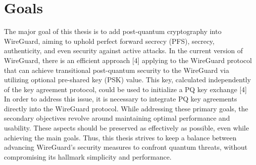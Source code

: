 

\section{Goals} 
The major goal of this thesis is to add post-quantum cryptography into WireGuard, aiming to uphold perfect forward secrecy (PFS), secrecy, authenticity, and even security against active attacks. In the current version of WireGuard, there is an efficient approach [4] applying to the WireGuard protocol that can achieve transitional post-quantum security to the WireGuard via utilizing optional pre-shared key (PSK) value. This key, calculated independently of the key agreement protocol, could be used to initialize a PQ key exchange [4]  In order to address this issue, it is necessary to integrate PQ key agreements directly into the WireGuard protocol. 
While addressing these primary goals, the secondary objectives revolve around maintaining optimal performance and usability. These aspects should be preserved as effectively as possible, even while achieving the main goals. Thus, this thesis strives to keep a balance between advancing WireGuard's security measures to confront quantum threats, without compromising its hallmark simplicity and performance.



